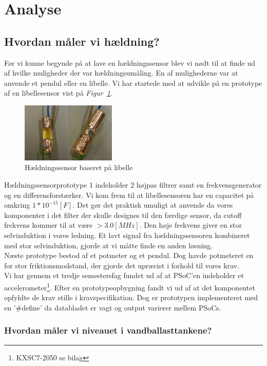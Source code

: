 \section{Analyse}
\subsection{Hvordan måler vi hældning?}
Før vi kunne begynde på at lave en hældningssensor blev vi nødt til at finde ud af hvilke muligheder der var hældningsumåling. En af mulighederne var at anvende et pendul eller en libelle. Vi har startede med at udvikle på en prototype af en libellesensor vist på \textit{Figur~\ref{fig:libelle}}.
\begin{figure}[hbpt]
\centering
\includegraphics[width=0.4\textwidth]{billeder/libellesensor1}
\caption{Hældningssensor baseret på libelle}
\label{fig:libelle}
\end{figure}
Hældningssensorprototype 1 indeholder 2 højpas filtrer samt en frekvensgenerator og en differensforstærker. Vi kom frem til at libellesensoren har en capacitet på omkring $1*10^{-15}[F]$. Det gør det praktisk umuligt at anvende da vores komponenter i det filter der skulle designes til den færdige sensor, da cutoff frekvens kommer til at være $>3.0[MHz]$. Den høje frekvens giver en stor selvinduktion i vores ledning. Et lavt signal fra hældningssensoren kombineret med stor selvinduktion, gjorde at vi måtte finde en anden løsning.\\
Næste prototype bestod af et potmeter og et pendul. Dog havde potmeteret en for stor friktionsmodstand, der gjorde det upræcist i forhold til vores krav.\\
Vi har gennem et tredje semestersfag fundet ud af at PSoC'en indeholder et accelerometer\footnote{KXSC7-2050 se bilag}. Efter en prototypeopbygning fandt vi ud af at det komponentet opfyldte de krav stille i kravspecifikation. Dog er prototypen implementeret med en '\#define' da databladet er vagt og output varierer mellem PSoCs.


\subsubsection{Hvordan måler vi niveauet i vandballasttankene?}
